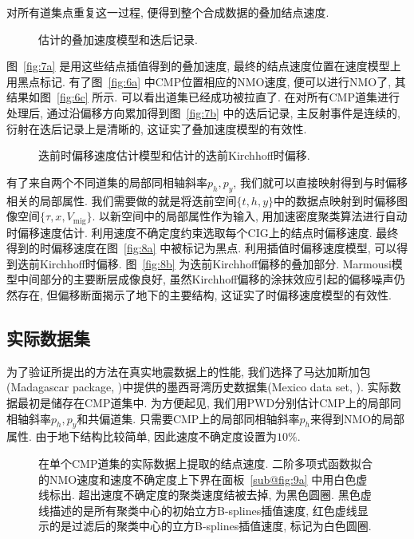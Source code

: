 对所有道集点重复这一过程, 便得到整个合成数据的叠加结点速度. 
\begin{figure}[htb]
    \centering
    \caption{估计的叠加速度模型和迭后记录. \label{fig:7}}
\end{figure}
图~\ref{fig:7a} 是用这些结点插值得到的叠加速度, 最终的结点速度位置在速度模型上用黑点标记. 有了图~\ref{fig:6a} 中CMP位置相应的NMO速度, 便可以进行NMO了, 其结果如图~\ref{fig:6c} 所示. 可以看出道集已经成功被拉直了. 在对所有CMP道集进行处理后, 通过沿偏移方向累加得到图~\ref{fig:7b} 中的迭后记录, 主反射事件是连续的, 衍射在迭后记录上是清晰的, 这证实了叠加速度模型的有效性. 
\begin{figure}[htb]
    \centering
    \caption{迭前时偏移速度估计模型和估计的迭前Kirchhoff时偏移. \label{fig:8}}
\end{figure}

有了来自两个不同道集的局部同相轴斜率$p_h, p_y$, 我们就可以直接映射得到与时偏移相关的局部属性. 我们需要做的就是将迭前空间$\{t,h,y\}$中的数据点映射到时偏移图像空间$\{\tau,x,V_{\mathrm{mig}}\}$. 以新空间中的局部属性作为输入, 用加速密度聚类算法进行自动时偏移速度估计. 利用速度不确定度约束选取每个CIG上的结点时偏移速度. 最终得到的时偏移速度在图~\ref{fig:8a} 中被标记为黑点. 利用插值时偏移速度模型, 可以得到迭前Kirchhoff时偏移. 图~\ref{fig:8b} 为迭前Kirchhoff偏移的叠加部分. Marmousi模型中间部分的主要断层成像良好, 虽然Kirchhoff偏移的涂抹效应引起的偏移噪声仍然存在, 但偏移断面揭示了地下的主要结构, 这证实了时偏移速度模型的有效性. 
\subsection{实际数据集}
为了验证所提出的方法在真实地震数据上的性能, 我们选择了马达加斯加包(Madagascar package, \cite{Fomel2013})中提供的墨西哥湾历史数据集(Mexico data set, \cite{Claerbout1995}). 实际数据最初是储存在CMP道集中. 为方便起见, 我们用PWD分别估计CMP上的局部同相轴斜率$p_h, p_y$和共偏道集. 只需要CMP上的局部同相轴斜率$p_h$来得到NMO的局部属性. 由于地下结构比较简单, 因此速度不确定度设置为$10\%$. 
\begin{figure*}
    \centering
    \caption{在单个CMP道集的实际数据上提取的结点速度. 二阶多项式函数拟合的NMO速度和速度不确定度上下界在面板~\ref{sub@fig:9a} 中用白色虚线标出. 超出速度不确定度的聚类速度结被去掉, 为黑色圆圈. 黑色虚线描述的是所有聚类中心的初始立方B-splines插值速度, 红色虚线显示的是过滤后的聚类中心的立方B-splines插值速度, 标记为白色圆圈. \label{fig:9}}
\end{figure*}

